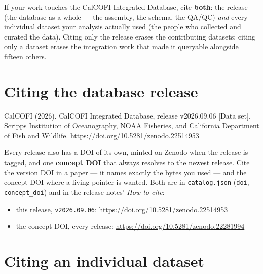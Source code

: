 \documentclass[
  letterpaper,
  DIV=11,
  numbers=noendperiod]{scrreprt}
\providecommand{\tightlist}{%
  \setlength{\itemsep}{0pt}\setlength{\parskip}{0pt}}
\begin{document}
\begin{tcolorbox}[enhanced jigsaw, arc=.35mm, colback=white, left=2mm, leftrule=.75mm, titlerule=0mm, bottomrule=.15mm, colbacktitle=quarto-callout-important-color!10!white, colframe=quarto-callout-important-color-frame, rightrule=.15mm, title=\textcolor{quarto-callout-important-color}{\faExclamation}\hspace{0.5em}{Two things to cite, always}, breakable, opacityback=0, toptitle=1mm, toprule=.15mm, coltitle=black, bottomtitle=1mm, opacitybacktitle=0.6]

If your work touches the CalCOFI Integrated Database, cite
\textbf{both}: the release (the database as a whole --- the assembly,
the schema, the QA/QC) \emph{and} every individual dataset your analysis
actually used (the people who collected and curated the data). Citing
only the release erases the contributing datasets; citing only a dataset
erases the integration work that made it queryable alongside fifteen
others.

\end{tcolorbox}

\section{Citing the database release}\label{citing-the-database-release}

CalCOFI (2026). CalCOFI Integrated Database, release v2026.09.06 {[}Data
set{]}. Scripps Institution of Oceanography, NOAA Fisheries, and
California Department of Fish and Wildlife.
https://doi.org/10.5281/zenodo.22514953

Every release also has a DOI of its own, minted on Zenodo when the
release is tagged, and one \textbf{concept DOI} that always resolves to
the newest release. Cite the version DOI in a paper --- it names exactly
the bytes you used --- and the concept DOI where a living pointer is
wanted. Both are in \texttt{catalog.json} (\texttt{doi},
\texttt{concept\_doi}) and in the release notes' \emph{How to cite}:

\begin{itemize}
\tightlist
\item
  this release, \texttt{v2026.09.06}:
  \url{https://doi.org/10.5281/zenodo.22514953}
\item
  the concept DOI, every release:
  \url{https://doi.org/10.5281/zenodo.22281994}
\end{itemize}

\section{Citing an individual
dataset}\label{citing-an-individual-dataset}
\end{document}
